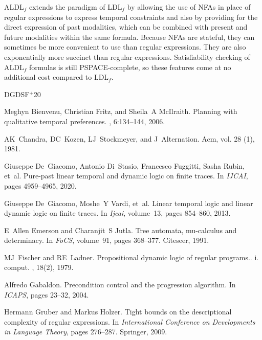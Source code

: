 \documentclass[10pt,a4paper]{amsart}
\theoremstyle{plain}
\theoremstyle{definition}
\theoremstyle{definition}
\DeclareMathOperator{\?}{?}
\begin{document}
ALDL$_f$ extends the paradigm of LDL$_f$ by allowing the use of NFAs in place of regular expressions to express temporal constraints and also by providing for the direct expression of past modalities, which can be combined with present and future modalities within the same formula. Because NFAs are stateful, they can sometimes be more convenient to use than regular expressions. They are also exponentially more succinct than regular expressions. Satisfiability checking of ALDL$_f$ formulas is still PSPACE-complete, so these features come at no additional cost compared to LDL$_f$.


\newcommand{\etalchar}[1]{$^{#1}$}
\begin{thebibliography}{DGDSF{\etalchar{+}}20}

Meghyn Bienvenu, Christian Fritz, and Sheila~A McIlraith.
\newblock Planning with qualitative temporal preferences.
, 6:134--144, 2006.

AK~Chandra, DC~Kozen, LJ~Stockmeyer, and J~Alternation.
\newblock Acm, vol. 28 (1), 1981.

\bibitem[DGDSF{\etalchar{+}}20]{pldlf}
Giuseppe De~Giacomo, Antonio Di~Stasio, Francesco Fuggitti, Sasha Rubin, et~al.
\newblock Pure-past linear temporal and dynamic logic on finite traces.
\newblock In {\em IJCAI}, pages 4959--4965, 2020.

\bibitem[DGV{\etalchar{+}}13]{ldlf}
Giuseppe De~Giacomo, Moshe~Y Vardi, et~al.
\newblock Linear temporal logic and linear dynamic logic on finite traces.
\newblock In {\em Ijcai}, volume~13, pages 854--860, 2013.

E~Allen Emerson and Charanjit~S Jutla.
\newblock Tree automata, mu-calculus and determinacy.
\newblock In {\em FoCS}, volume~91, pages 368--377. Citeseer, 1991.

MJ~Fischer and RE~Ladner.
\newblock Propositional dynamic logic of regular programs.. i. comput.
, 18(2), 1979.

Alfredo Gabaldon.
\newblock Precondition control and the progression algorithm.
\newblock In {\em ICAPS}, pages 23--32, 2004.

Hermann Gruber and Markus Holzer.
\newblock Tight bounds on the descriptional complexity of regular expressions.
\newblock In {\em International Conference on Developments in Language Theory}, pages 276--287. Springer, 2009.


\end{thebibliography}
\end{document}
